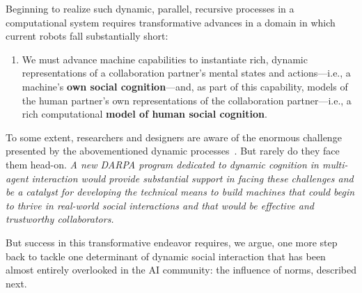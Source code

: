 \documentclass[12pt]{article}
\begin{document}
Beginning to realize such dynamic, parallel, recursive processes in a
computational system requires transformative advances in a domain in which current robots fall substantially short:

\vspace{-1 mm}
\begin{enumerate}[label= \arabic*., leftmargin=*,align=left]


\item We must advance machine capabilities to instantiate rich, dynamic
  representations of a collaboration partner's mental states and
  actions---i.e., a machine's {\bf own social cognition}---and, as
  part of this capability, models of the human partner's own
  representations of the collaboration partner---i.e., a rich
  computational {\bf model of human social cognition}.
\end{enumerate}
\vspace{-1 mm}

To some extent, researchers and designers are aware of the enormous
challenge presented by the abovementioned dynamic processes~\citep{williams_robot_2012,cangelosi_2015}. But rarely do they face them head-on.  {\em A new DARPA program
dedicated to dynamic cognition in multi-agent interaction would
provide substantial support in facing these challenges and be a
catalyst for developing the technical means to build machines that
could begin to thrive in real-world social interactions and that would be effective
and trustworthy collaborators.}

But success in this transformative endeavor requires, we argue, one
more step back to tackle one determinant of dynamic social interaction
that has been almost entirely overlooked in the AI community: the
influence of norms, described next. 
\end{document}

